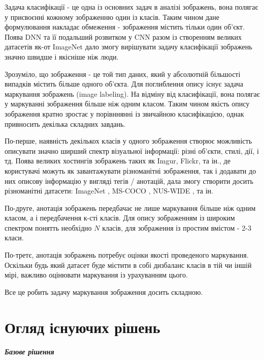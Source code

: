 \documentclass{udstu}
\begin{document}
Задача класифікації - це одна із основних задач в аналізі зображень, вона полягає
у присвоєнні кожному зображенню один із класів. Таким чином дане формулювання накладає
обмеження - зображення містить тільки один об'єкт. Поява DNN \cite{dnn-cls}
та її подальший розвитком у CNN \cite{cnn-cls-1,cnn-cls-2} разом із створенням
великих датасетів як-от ImageNet \cite{deng2009imagenet} дало змогу вирішувати задачу
класифікації зображень значно швидше і якісніше ніж люди.

Зрозуміло, що зображення - це той тип даних, який у абсолютній більшості випадків містить більше одного об'єкта.
Для поглиблення опису існує задача маркування зображень (image labeling). На відміну від
класифікації, вона полягає у маркуванні зображення більше ніж одним класом. Таким чином
якість опису зображення кратно зростає у порівннянні із звичайною класифікацією,
однак привносить декілька складних завдань.

По-перше, наявність декількох класів у одного зображення створює можливість
описувати значно ширший спектр візуальної інформації: різні об'єкти, стилі, дії, і тд.
Поява великих хостингів зображень таких як Imgur, Flickr, та ін., де користувачі можуть
як завантажувати різноманітні зображення, так і додавати до них описову інформацію у вигляді
тегів / анотацій, дала змогу створити досить різноманітні датасети: ImageNet \cite{deng2009imagenet},
MS-COCO \cite{cocodataset}, NUS-WIDE \cite{nus-wide-civr09}, та ін.

По-друге, анотація зображень передбачає не лише маркування більше ніж одним класом,
а і передбачення к-сті класів. Для опису зображенням із широким спектром понятть необхідно $N$ класів,
для зображення із простим вмістом - 2-3 класи.

По-третє, анотація зображень потребує оцінки якості проведеного маркування. Оскільки будь який
датасет буде містити в собі дизбаланс класів в тій чи іншій мірі, важливо оцінювати маркування із
урахуванням цього.

Все це робить задачу маркування зображення досить складною.


\chapter{Огляд існуючих рішень}

\paragraph{\textbf{Базове рішення}\\}
\end{document}
